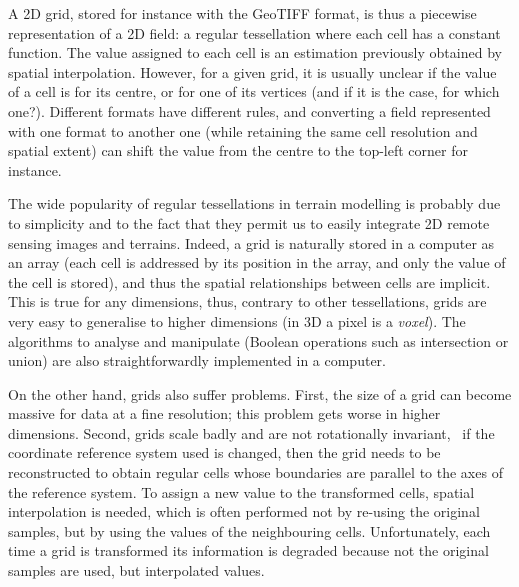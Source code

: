 %

\begin{kaobox-practice}[frametitle=\faCog\ Concrete example: a 2D grid]
  A 2D grid, stored for instance with the GeoTIFF format, is thus a piecewise representation of a 2D field: a regular tessellation where each cell has a constant function.
  The value assigned to each cell is an estimation previously obtained by spatial interpolation.
  However, for a given grid, it is usually unclear if the value of a cell is for its centre, or for one of its vertices (and if it is the case, for which one?).
  Different formats have different rules, and converting a field represented with one format to another one (while retaining the same cell resolution and spatial extent) can shift the value from the centre to the top-left corner for instance.
\end{kaobox-practice}

%

The wide popularity of regular tessellations in terrain modelling is probably due to simplicity and to the fact that they permit us to easily integrate 2D remote sensing images and terrains.
Indeed, a grid is naturally stored in a computer as an array (each cell is addressed by its position in the array, and only the value of the cell is stored), and thus the spatial relationships between cells are implicit. 
This is true for any dimensions, thus, contrary to other tessellations, grids are very easy to generalise to higher dimensions (in 3D a pixel is a \emph{voxel}).%
The algorithms to analyse and manipulate (Boolean operations such as intersection or union) are also straightforwardly implemented in a computer. 

On the other hand, grids also suffer problems.
First, the size of a grid can become massive for data at a fine resolution; this problem gets worse in higher dimensions.
Second, grids scale badly and are not rotationally invariant, \ie\ if the coordinate reference system used is changed, then the grid needs to be reconstructed to obtain regular cells whose boundaries are parallel to the axes of the reference system.
To assign a new value to the transformed cells, spatial interpolation is needed, which is often performed not by re-using the original samples, but by using the values of the neighbouring cells.
Unfortunately, each time a grid is transformed its information is degraded because not the original samples are used, but interpolated values.



